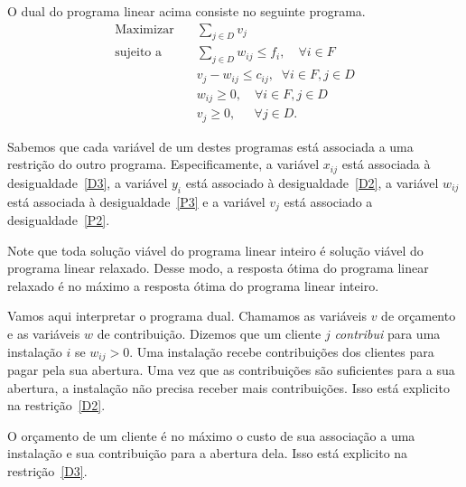        O dual do programa linear acima consiste no seguinte programa.
    \label{D}
    \begin{align}
        \text{Maximizar} \quad & \sum_{j \in D} v_{j} \tag{D1} \label{D1}\\
        \text{sujeito a} \quad & \sum_{j\in D} w_{ij}\leq f_i, \quad \forall i \in F \tag{D2} \label{D2}\\
        &v_{j} - w_{ij}\leq c_{ij},  \; \; \forall i\in F,j\in D \tag{D3} \label{D3}\\
        &w_{ij} \geq 0 ,\quad \forall i\in F,j\in D\tag{D4} \label{D4}\\
        &v_j \geq 0, \quad \; \,\forall j\in D \tag{D5} \label{D5}.
       \end{align}

Sabemos que cada variável de um destes programas está associada a uma restrição do outro programa. 
Especificamente, a variável $x_{ij}$ está associada à desigualdade~\eqref{D3}, a variável $y_i$ está associado à desigualdade~\eqref{D2}, a variável $w_{ij}$ está associada à desigualdade~\eqref{P3} e a variável $v_j$ está associado a desigualdade~\eqref{P2}.

Note que toda solução viável do programa linear inteiro é solução viável do programa linear relaxado. Desse modo, a resposta ótima do programa linear relaxado é no máximo a resposta ótima do programa linear inteiro.

Vamos aqui interpretar o programa dual. Chamamos as variáveis $v$ de orçamento e as variáveis $w$ de contribuição. Dizemos que um cliente $j$ \emph{contribui} para uma instalação $i$ se $w_{ij} > 0$. Uma instalação recebe contribuições dos clientes para pagar pela sua abertura. Uma vez que as contribuições são suficientes para a sua abertura, a instalação não precisa receber mais contribuições. Isso está explicito na restrição~\eqref{D2}.

O orçamento de um cliente é no máximo o custo de sua associação a uma instalação e sua contribuição para a abertura dela. Isso está explicito na restrição~\eqref{D3}.

